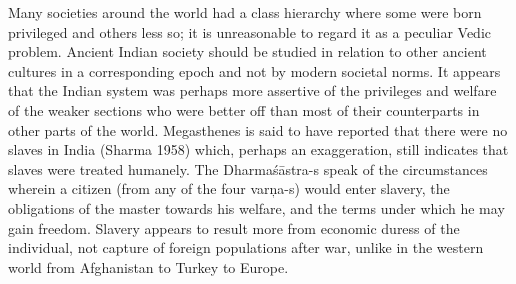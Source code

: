 Many societies around the world had a class hierarchy where some were born privileged and others less so; it is unreasonable to regard it as a peculiar Vedic problem. Ancient Indian society should be studied in relation to other ancient cultures in a corresponding epoch and not by modern societal norms. It appears that the Indian system was perhaps more assertive of the privileges and welfare of the weaker sections who were better off than most of their counterparts in other parts of the world. Megasthenes is said to have reported that there were no slaves in India (Sharma 1958) which, perhaps an exaggeration, still indicates that slaves were treated humanely. The Dharmaśāstra-s speak of the circumstances wherein a citizen (from any of the four varņa-s) would enter slavery, the obligations of the master towards his welfare, and the terms under which he may gain freedom. Slavery appears to result more from economic duress of the individual, not capture of foreign populations after war, unlike in the western world from Afghanistan to Turkey to Europe.

